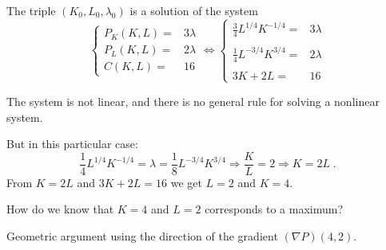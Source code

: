 \begin{frame}
  The triple $(K_0,L_0,\lambda_0)$ is a solution of the system
%
$$\left\{ \begin{array}{ll}
  P_K(K,L) = & 3\lambda\\
  P_L(K,L) = & 2\lambda  \\
  C(K,L) = & 16
\end{array} \right.
%
\Longleftrightarrow
%
\left\{ \begin{array}{ll}
  \frac{3}{4} L^{1/4}K^{-1/4} = & 3\lambda\\
  & \\
  \frac{1}{4} L^{-3/4}K^{3/4} = & 2\lambda  \\
  & \\
  3K+2L = & 16
\end{array} \right.
$$

\pause
The system is not linear, and there is no general rule for solving a nonlinear system. \pause

But in this particular case:
%
$$\frac{1}{4} L^{1/4}K^{-1/4} = \lambda = \frac{1}{8} L^{-3/4}K^{3/4} \Longrightarrow \frac{K}{L}=2 \Longrightarrow K = 2L\; .$$
%
From $K=2L$ and $3K+2L=16$ we get \pause $L=2$ and $K=4$.\pause

How do we know that $K=4$ and $L=2$ corresponds to a maximum? \pause

Geometric argument using the direction of the gradient $(\nabla P)(4,2)$.

\end{frame}

